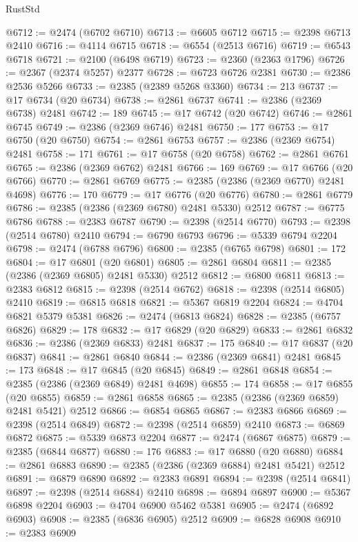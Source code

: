 \begin{lexlean}{RustStd}
\begin{coremodule}
{\begin{coremodule}
{{{{{{{{{{{{{{{{{{{{{{{{{{{{{{{{{{{{{{{{{{{{{{{{{{@6712 := @2474 (@6702 @6710)
@6713 := @6605 @6712
@6715 := @2398 @6713 @2410
@6716 := @4114 @6715
@6718 := @6554 (@2513 @6716)
@6719 := @6543 @6718
@6721 := @2100 (@6498 @6719)
@6723 := @2360 (@2363 @1796)
@6726 := @2367 (@2374 @5257) @2377
@6728 := @6723 @6726 @2381
@6730 := @2386 @2536 @5266
@6733 := @2385 (@2389 @5268 @3360)
@6734 := 213
@6737 := @17 @6734 (@20 @6734)
@6738 := @2861 @6737
@6741 := @2386 (@2369 @6738) @2481
@6742 := 189
@6745 := @17 @6742 (@20 @6742)
@6746 := @2861 @6745
@6749 := @2386 (@2369 @6746) @2481
@6750 := 177
@6753 := @17 @6750 (@20 @6750)
@6754 := @2861 @6753
@6757 := @2386 (@2369 @6754) @2481
@6758 := 171
@6761 := @17 @6758 (@20 @6758)
@6762 := @2861 @6761
@6765 := @2386 (@2369 @6762) @2481
@6766 := 169
@6769 := @17 @6766 (@20 @6766)
@6770 := @2861 @6769
@6775 := @2385 (@2386 (@2369 @6770) @2481 @4698)
@6776 := 170
@6779 := @17 @6776 (@20 @6776)
@6780 := @2861 @6779
@6786 := @2385 (@2386 (@2369 @6780) @2481 @5330) @2512
@6787 := @6775 @6786
@6788 := @2383 @6787
@6790 := @2398 (@2514 @6770)
@6793 := @2398 (@2514 @6780) @2410
@6794 := @6790 @6793
@6796 := @5339 @6794 @2204
@6798 := @2474 (@6788 @6796)
@6800 := @2385 (@6765 @6798)
@6801 := 172
@6804 := @17 @6801 (@20 @6801)
@6805 := @2861 @6804
@6811 := @2385 (@2386 (@2369 @6805) @2481 @5330) @2512
@6812 := @6800 @6811
@6813 := @2383 @6812
@6815 := @2398 (@2514 @6762)
@6818 := @2398 (@2514 @6805) @2410
@6819 := @6815 @6818
@6821 := @5367 @6819 @2204
@6824 := @4704 @6821 @5379 @5381
@6826 := @2474 (@6813 @6824)
@6828 := @2385 (@6757 @6826)
@6829 := 178
@6832 := @17 @6829 (@20 @6829)
@6833 := @2861 @6832
@6836 := @2386 (@2369 @6833) @2481
@6837 := 175
@6840 := @17 @6837 (@20 @6837)
@6841 := @2861 @6840
@6844 := @2386 (@2369 @6841) @2481
@6845 := 173
@6848 := @17 @6845 (@20 @6845)
@6849 := @2861 @6848
@6854 := @2385 (@2386 (@2369 @6849) @2481 @4698)
@6855 := 174
@6858 := @17 @6855 (@20 @6855)
@6859 := @2861 @6858
@6865 := @2385 (@2386 (@2369 @6859) @2481 @5421) @2512
@6866 := @6854 @6865
@6867 := @2383 @6866
@6869 := @2398 (@2514 @6849)
@6872 := @2398 (@2514 @6859) @2410
@6873 := @6869 @6872
@6875 := @5339 @6873 @2204
@6877 := @2474 (@6867 @6875)
@6879 := @2385 (@6844 @6877)
@6880 := 176
@6883 := @17 @6880 (@20 @6880)
@6884 := @2861 @6883
@6890 := @2385 (@2386 (@2369 @6884) @2481 @5421) @2512
@6891 := @6879 @6890
@6892 := @2383 @6891
@6894 := @2398 (@2514 @6841)
@6897 := @2398 (@2514 @6884) @2410
@6898 := @6894 @6897
@6900 := @5367 @6898 @2204
@6903 := @4704 @6900 @5462 @5381
@6905 := @2474 (@6892 @6903)
@6908 := @2385 (@6836 @6905) @2512
@6909 := @6828 @6908
@6910 := @2383 @6909
}}}}}}}}}}}}}}}}}}}}}}}}}}}}}}}}}}}}}}}}}}}}}}}}}}
\end{coremodule}}
\end{coremodule}
\end{lexlean}
